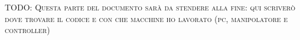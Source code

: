 \textsc{TODO: Questa parte del documento sarà da stendere alla fine: qui scriverò dove trovare il codice e con che macchine ho lavorato (pc, manipolatore e controller)}
